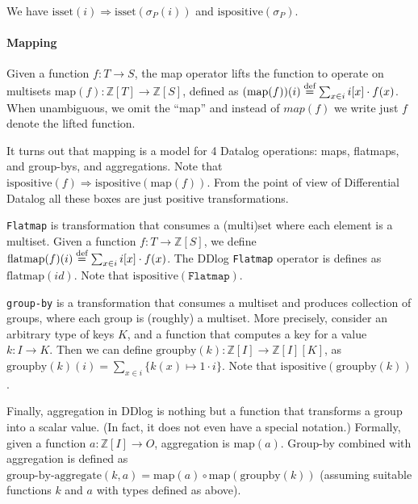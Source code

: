 \documentclass[10pt]{article}
\newcommand{\code}[1]{\texttt{#1}}
\newcommand{\Z}{\mathbb{Z}}  %
\newcommand{\id}{\ensuremath{\mathit{id}}} %
\newcommand{\isset}{\mbox{isset}}
\newcommand{\ispositive}{\mbox{ispositive}}
\newcommand{\defn}{\stackrel{\textrm{\scriptsize def}}{=}}
\newcommand{\map}{\mbox{map}}
\begin{document}

We have $\isset(i) \Rightarrow \isset(\sigma_P(i))$ and
$\ispositive(\sigma_P)$.

\paragraph{Mapping}

Given a function $f : T \rightarrow S$, the map operator lifts the
function to operate on multisets $\map(f) : \Z[T] \rightarrow \Z[S]$,
defined as $(\map(f))(i) \defn \sum_{x \in i} i[x] \cdot f(x)$.  When
unambiguous, we omit the ``map'' and instead of $map(f)$ we write just
$f$ denote the lifted function.

It turns out that mapping is a model for 4 Datalog operations: maps,
flatmaps, and group-bys, and aggregations.  Note that $\ispositive(f)
\Rightarrow \ispositive(\map(f))$.  From the point of view of
Differential Datalog all these boxes are just positive
transformations.

\code{Flatmap} is transformation that consumes a (multi)set where each
element is a multiset. Given a function $f : T \rightarrow \Z[S]$, we
define $\mbox{flatmap}(f)(i) \defn \sum_{x \in i} i[x] \cdot f(x)$.
The DDlog \code{Flatmap} operator is defines as $\mbox{flatmap}(\id)$.
Note that $\ispositive(\code{Flatmap})$.

\code{group-by} is a transformation that consumes a multiset and
produces collection of groups, where each group is (roughly) a
multiset.  More precisely, consider an arbitrary type of keys $K$, and
a function that computes a key for a value $k: I \rightarrow K$.  Then
we can define $\mbox{groupby}(k): \Z[I] \rightarrow \Z[I][K]$, as
$\mbox{groupby}(k)(i) = \sum_{x \in i} \{ k(x) \mapsto 1 \cdot i \}$.
Note that $\ispositive(\mbox{groupby}(k))$.

Finally, aggregation in DDlog is nothing but a function that
transforms a group into a scalar value.  (In fact, it does not even
have a special notation.)  Formally, given a function $a: \Z[I]
\rightarrow O$, aggregation is $\map(a)$.  Group-by combined with
aggregation is defined as $\mbox{group-by-aggregate}(k, a) = \map(a)
\circ \map(\mbox{groupby}(k))$ (assuming suitable functions $k$ and
$a$ with types defined as above).
\end{document}
